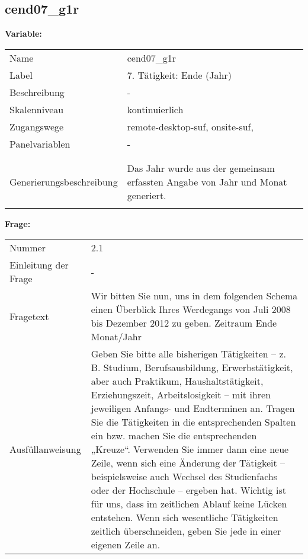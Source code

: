 	
	
	\subsection{cend07\_g1r}
	\label{subSection:cend07_g1r}

	\noindent\textbf{Variable:}\\
		\begin{tabular}{lL{11.3cm}}
			\label{tableVariable:cend07_g1r}
			Name & cend07\_g1r \\
			Label & 7. Tätigkeit: Ende (Jahr)  \\
			Beschreibung & - \\
			Skalenniveau & kontinuierlich \\
			Zugangswege &
				remote-desktop-suf,
				onsite-suf,
 \\
			Panelvariablen & -
			 \\
			 \\
 \\
					Generierungsbeschreibung & Das Jahr wurde aus der gemeinsam erfassten Angabe von Jahr und Monat generiert. 
				 \\	
			 \\
		\end{tabular}

		\vspace*{1 cm}
		\noindent\textbf{Frage:}\\
		\begin{tabular}{lL{11.3cm}}
			\label{tableQuestion:cend07_g1r}
			Nummer & 2.1 \\
			Einleitung der Frage & - \\
			Fragetext & Wir bitten Sie nun, uns in dem folgenden Schema einen Überblick Ihres Werdegangs von Juli 2008 bis Dezember 2012 zu geben.
Zeitraum
Ende
Monat/Jahr \\
			Ausfüllanweisung & Geben Sie bitte alle bisherigen Tätigkeiten – z. B. Studium, Berufsausbildung, Erwerbstätigkeit, aber auch Praktikum, Haushaltstätigkeit,
Erziehungszeit, Arbeitslosigkeit – mit ihren jeweiligen Anfangs- und Endterminen an. Tragen Sie die Tätigkeiten in die entsprechenden Spalten ein bzw. machen Sie die entsprechenden „Kreuze“. Verwenden Sie immer dann eine neue Zeile, wenn sich eine Änderung der Tätigkeit – beispielsweise auch Wechsel des Studienfachs oder der Hochschule – ergeben hat. Wichtig ist für uns, dass im zeitlichen Ablauf keine Lücken entstehen. Wenn sich wesentliche Tätigkeiten zeitlich überschneiden, geben Sie jede in einer eigenen Zeile an. \\
		\end{tabular}




